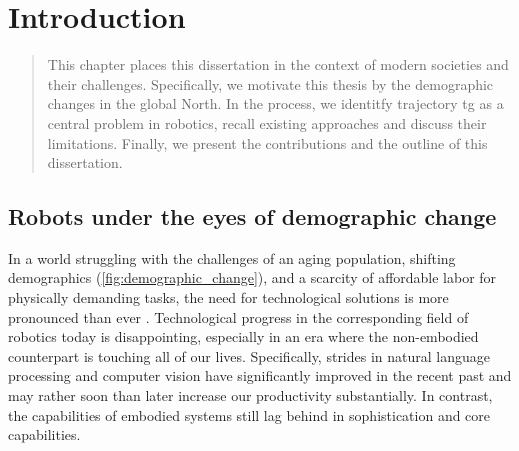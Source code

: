 \chapter{Introduction} %
\label{cha:intro}


\begin{abstract}
This chapter places this dissertation in the context of
modern societies and their challenges. Specifically, we
motivate this thesis by the demographic changes in the
global North. In the process, we identitfy trajectory
\acl{tg} as a central problem in robotics, recall existing
approaches and discuss their limitations. Finally, we
present the contributions and the outline of this
dissertation.
\end{abstract}

\newpage


\section{Robots under the eyes of demographic change}

In a world struggling with the challenges of an aging
population, shifting demographics
(\cref{fig:demographic_change}), and a scarcity of
affordable labor for physically demanding tasks, the need
for technological solutions is more pronounced than ever
\cite{ince2015economic}. Technological progress in the
corresponding field of robotics today is disappointing,
especially in an era where the non-embodied counterpart is
touching all of our lives. Specifically, strides in natural
language processing and computer vision have significantly
improved in the recent past and may rather soon than later
increase our productivity substantially. In contrast, the
capabilities of embodied systems still lag behind in
sophistication and core capabilities.

